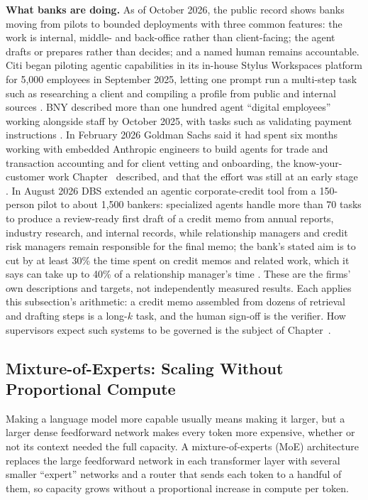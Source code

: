 \documentclass[../ai_in_finance]{subfiles}
\begin{document}
\textbf{What banks are doing.} As of October 2026, the public record shows banks moving from pilots to bounded deployments with three common features: the work is internal, middle- and back-office rather than client-facing; the agent drafts or prepares rather than decides; and a named human remains accountable. Citi began piloting agentic capabilities in its in-house Stylus Workspaces platform for 5,000 employees in September 2025, letting one prompt run a multi-step task such as researching a client and compiling a profile from public and internal sources \parencite{torres2025citi}. BNY described more than one hundred agent ``digital employees'' working alongside staff by October 2025, with tasks such as validating payment instructions \parencite{axios2025bny}. In February 2026 Goldman Sachs said it had spent six months working with embedded Anthropic engineers to build agents for trade and transaction accounting and for client vetting and onboarding, the know-your-customer work Chapter~ described, and that the effort was still at an early stage \parencite{cnbc2026goldman}. In August 2026 DBS extended an agentic corporate-credit tool from a 150-person pilot to about 1,500 bankers: specialized agents handle more than 70 tasks to produce a review-ready first draft of a credit memo from annual reports, industry research, and internal records, while relationship managers and credit risk managers remain responsible for the final memo; the bank's stated aim is to cut by at least 30\% the time spent on credit memos and related work, which it says can take up to 40\% of a relationship manager's time \parencite{dbs2026credit}. These are the firms' own descriptions and targets, not independently measured results. Each applies this subsection's arithmetic: a credit memo assembled from dozens of retrieval and drafting steps is a long-$k$ task, and the human sign-off is the verifier. How supervisors expect such systems to be governed is the subject of Chapter~.

\subsection{Mixture-of-Experts: Scaling Without Proportional Compute}
\label{sec:mixture-of-experts}

Making a language model more capable usually means making it larger, but a larger dense feedforward network makes every token more expensive, whether or not its context needed the full capacity. A mixture-of-experts (MoE) architecture replaces the large feedforward network in each transformer layer with several smaller ``expert'' networks and a router that sends each token to a handful of them, so capacity grows without a proportional increase in compute per token.
\end{document}
